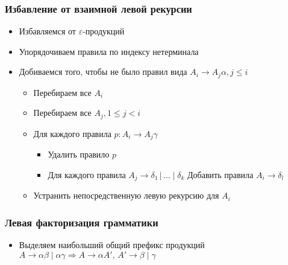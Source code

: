 \documentclass{beamer}
\begin{document}
\begin{frame}[fragile]
  \transwipe[direction=90]
  \frametitle{Избавление от взаимной левой рекурсии}
  \begin{itemize}
   \item Избавляемся от $\varepsilon$-продукций
   \item Упорядочиваем правила по индексу нетерминала
   \item Добиваемся того, чтобы не было правил вида $A_i \to A_j \alpha, j \leq i$
   \begin{itemize}
     \item Перебираем все $A_i$
     \item Перебираем все $A_j, 1 \leq j < i$
     \item Для каждого правила $p: A_i \to A_j \gamma$
     \begin{itemize}
       \item Удалить правило $p$
       \item Для каждого правила $A_j \to \delta_1 \,|\, \dots \mid \delta_k$ Добавить правила $A_i \to \delta_l$
     \end{itemize}
     \item Устранить непосредственную левую рекурсию для $A_i$
   \end{itemize}
  \end{itemize}
\end{frame}

 
\begin{frame}[fragile]
  \transwipe[direction=90]
  \frametitle{Левая факторизация грамматики}
  \begin{itemize}
   \item Выделяем наибольший общий префикс продукций $A \to \alpha \beta \mid \alpha \gamma \Rightarrow A\to \alpha A', \, A' \to \beta \mid \gamma$
  \end{itemize}
\end{frame}
\end{document}
